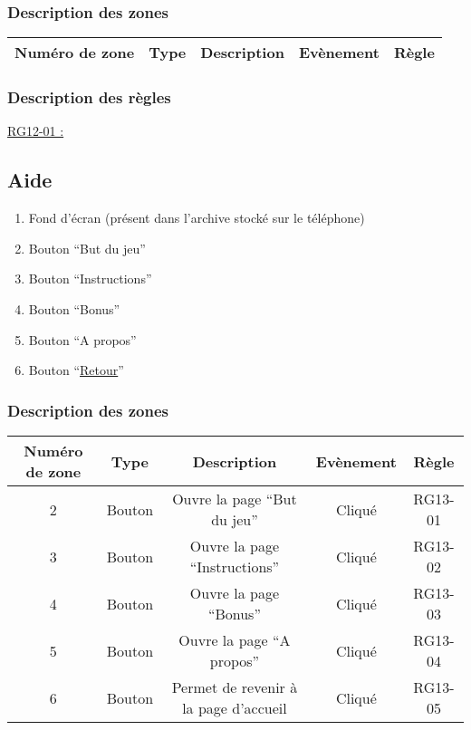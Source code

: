 \documentclass{report}
\begin{document}
		\subsubsection{Description des zones}
		
			\begin{tabular}{|c|c|c|c|c|} \hline
				Numéro de zone & Type  & Description & Evènement &	Règle \\\hline
			\end{tabular}
			
		\subsubsection{Description des règles}

			\underline{RG12-01 :}
				\begin{quote}
				
				\end{quote}
				
\newpage
	
	\subsection{Aide}
		
		\hypertarget{Aide}{}
		\label{Aide}
			
		\begin{center}
			
		\end{center}

		\begin{enumerate}
		  \item Fond d'écran (présent dans l'archive stocké sur le téléphone)
		  \item Bouton ``But du jeu''
		  \item Bouton ``Instructions''
		  \item Bouton ``Bonus''
		  \item Bouton ``A propos''
		  \item Bouton ``\hyperlink{Accueil}{Retour}''
		\end{enumerate}

		\subsubsection{Description des zones}
		
			\begin{tabular}{|c|c|c|c|c|} \hline
				Numéro de zone & Type  & Description & Evènement &	Règle \\\hline
				2 & Bouton & Ouvre la page ``But du jeu'' & Cliqué & RG13-01 \\\hline
				3 & Bouton & Ouvre la page ``Instructions'' & Cliqué & RG13-02 \\\hline
				4 & Bouton & Ouvre la page ``Bonus'' & Cliqué & RG13-03 \\\hline
				5 & Bouton & Ouvre la page ``A propos'' & Cliqué & RG13-04 \\\hline
				6 & Bouton & Permet de revenir à la page d'accueil & Cliqué & RG13-05 \\\hline
			\end{tabular}
			
\end{document}
